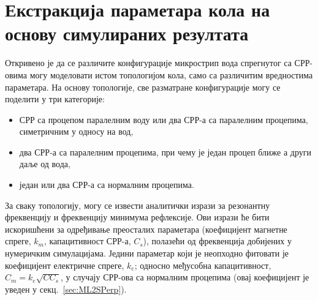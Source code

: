 \documentclass[main.tex]{subfiles}
\begin{document}
\section{Екстракција параметара кола на основу симулираних резултата}

Откривено је да се различите конфигурације микрострип вода спрегнутог са СРР-овима могу моделовати истом топологијом кола, само са различитим вредностима параметара. На основу топологије, све разматране конфигурације могу се поделити у три категорије:
\begin{itemize}
\item СРР са процепом паралелним воду или два СРР-а са паралелним процепима, симетричним у односу на вод,
\item два СРР-а са паралелним процепима, при чему је један процеп ближе а други даље од вода,
\item један или два СРР-а са нормалним процепима.
\end{itemize}
За сваку топологију, могу се извести аналитички изрази за резонантну фреквенцију и фреквенцију минимума рефлексије. Ови изрази ће бити искоришћени за одређивање преосталих параметара (коефицијент магнетне спреге, $k_m$, капацитивност СРР-а, $C_s$), полазећи од фреквенција добијених у нумеричким симулацијама. Једини параметар који је неопходно фитовати је коефицијент електричне спреге, $k_e$; односно међусобна капацитивност, $C_m=k_e \sqrt{CC_s }$, у случају СРР-ова са нормалним процепима (овај коефицијент је уведен у секц.~\ref{sec:ML2SPerp}). 
\end{document}
